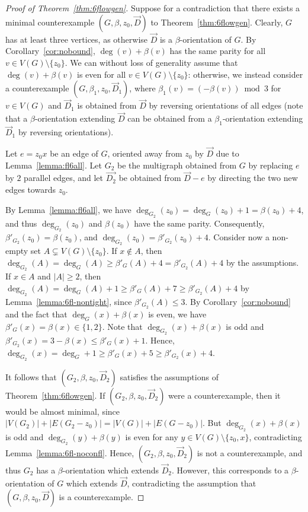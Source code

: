 \documentclass[12pt,twoside,openright,a4paper]{book}
\begin{document}
\begin{proof}[Proof of Theorem~\ref{thm:6flowgen}]
Suppose for a contradiction that there exists a minimal counterexample $(G,\beta,z_0,\vec{D})$ to Theorem~\ref{thm:6flowgen}.
Clearly, $G$ has at least three vertices, as otherwise $\vec{D}$ is a $\beta$-orientation of $G$.
By Corollary~\ref{cor:nobound}, $\deg(v)+\beta(v)$ has the same parity for all $v\in V(G)\setminus \{z_0\}$.
We can without loss of generality assume that $\deg(v)+\beta(v)$ is even for all $v\in V(G)\setminus \{z_0\}$:
otherwise, we instead consider a counterexample $(G,\beta_1,z_0,\vec{D}_1)$, where $\beta_1(v)=(-\beta(v))\bmod 3$ for $v\in V(G)$
and $\vec{D}_1$ is obtained from $\vec{D}$ by reversing orientations of all edges (note that a $\beta$-orientation extending $\vec{D}$
can be obtained from a $\beta_1$-orientation extending $\vec{D}_1$ by reversing orientations).

Let $e=z_0x$ be an edge of $G$, oriented away from $z_0$ by $\vec{D}$ due to Lemma~\ref{lemma:fl6all}.
Let $G_2$ be the multigraph obtained from $G$ by replacing $e$ by $2$ parallel edges,
and let $\vec{D_2}$ be obtained from $\vec{D}-e$ by directing the two new edges towards $z_0$.

By Lemma~\ref{lemma:fl6all}, we have $\deg_{G_2}(z_0)=\deg_G(z_0)+1=\beta(z_0)+4$, and thus
$\deg_{G_2}(z_0)$ and $\beta(z_0)$ have the same parity.  Consequently, $\beta'_{G_2}(z_0)=\beta(z_0)$,
and $\deg_{G_2}(z_0)=\beta'_{G_2}(z_0)+4$.  Consider now a non-empty set $A\subsetneq V(G)\setminus\{z_0\}$.
If $x\not\in A$, then $\deg_{G_2}(A)=\deg_G(A)\ge \beta'_G(A)+4=\beta'_{G_2}(A)+4$ by the assumptions.
If $x\in A$ and $|A|\ge 2$, then $\deg_{G_2}(A)=\deg_G(A)+1\ge \beta'_G(A)+7\ge \beta'_{G_2}(A)+4$
by Lemma~\ref{lemma:6fl-nontight}, since $\beta'_{G_2}(A)\le 3$.  By Corollary~\ref{cor:nobound} and
the fact that $\deg_G(x)+\beta(x)$ is even, we have $\beta'_G(x)=\beta(x)\in \{1,2\}$.
Note that $\deg_{G_2}(x)+\beta(x)$ is odd and $\beta'_{G_2}(x)=3-\beta(x)\le \beta'_G(x)+1$.
Hence, $\deg_{G_2}(x)=\deg_G+1\ge \beta'_G(x)+5\ge \beta'_{G_2}(x)+4$.

It follows that $(G_2,\beta,z_0,\vec{D}_2)$ satisfies the assumptions of Theorem~\ref{thm:6flowgen}.
If $(G_2,\beta,z_0,\vec{D}_2)$ were a counterexample, then it would be almost minimal, since
$|V(G_2)|+|E(G_2-z_0)|=|V(G)|+|E(G-z_0)|$.  But $\deg_{G_2}(x)+\beta(x)$ is odd and $\deg_{G_2}(y)+\beta(y)$ is even
for any $y\in V(G)\setminus \{z_0,x\}$, contradicting Lemma~\ref{lemma:6fl-noconfl}.
Hence, $(G_2,\beta,z_0,\vec{D}_2)$ is not a counterexample, and thus $G_2$ has a $\beta$-orientation which
extends $\vec{D}_2$.  However, this corresponds to a $\beta$-orientation of $G$ which extends $\vec{D}$,
contradicting the assumption that $(G,\beta,z_0,\vec{D})$ is a counterexample.
\end{proof}
\end{document}
